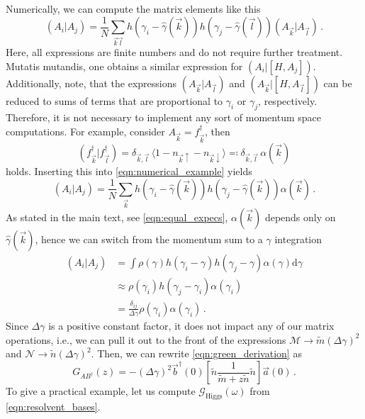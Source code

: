 \documentclass[
    reprint, 
    aps,
    preprintnumbers,
    twocolumn,
    prb,
    superscriptaddress
]{revtex4-2}
\newcommand{\vk}{\vec{k}}
\newcommand{\vl}{\vec{l}}
\newcommand{\dgamma}{\mathrm{d}\gamma}
\newcommand{\mM}{\mathcal{M}}
\newcommand{\mN}{\mathcal{N}}
\newcommand{\greens}[1]{\mathcal{G}_\text{#1} (\omega)}
\begin{document}
Numerically, we can compute the matrix elements like this
\begin{equation}
    \label{eqn:numerical_example}
    (A_i | A_j) = \frac{1}{N} \sum_{\vk \vl} h(\gamma_i - \hat{\gamma}(\vk)) h(\gamma_j - \hat{\gamma}(\vl)) (A_{\vk} | A_{\vl})\,.
\end{equation}
Here, all expressions are finite numbers and do not require further treatment.
Mutatis mutandis, one obtains a similar expression for $(A_i | [H, A_j])$.
Additionally, note, that the expressions $(A_{\vk} | A_{\vl})$ and $(A_{\vk} | [H, A_{\vl}])$ can be reduced to sums of terms that are proportional to $\gamma_i$ or $\gamma_j$, respectively.
Therefore, it is not necessary to implement any sort of momentum space computations.
For example, consider $A_{\vk} = f_{\vk}^\dagger$, then
\begin{equation}
    ( f_{\vk}^\dagger | f_{\vl}^\dagger ) = \delta_{\vk, \vl}\, \langle 1 - n_{\vk \uparrow} - n_{\vk \downarrow} \rangle \eqqcolon \delta_{\vk, \vl}\, \alpha(\vk)
\end{equation}
holds. Inserting this into \eqref{eqn:numerical_example} yields
\begin{equation}
    (A_i | A_j) = \frac{1}{N} \sum_{\vk} h(\gamma_i - \hat{\gamma}(\vk)) h(\gamma_j - \hat{\gamma}(\vk)) \alpha(\vk)\,.
\end{equation}
As stated in the main text, see \eqref{eqn:equal_expecs}, $\alpha(\vk)$ depends only on $\hat{\gamma}(\vk)$, hence we can switch from the momentum sum to a $\gamma$ integration
\begin{align}
    (A_i | A_j) &= \int \rho(\gamma) h(\gamma_i - \gamma) h(\gamma_j - \gamma) \alpha(\gamma) \dgamma \nonumber \\
        &\approx \rho(\gamma_i) h(\gamma_j - \gamma_i) \alpha(\gamma_i) \nonumber \\
        &= \frac{\delta_{ij}}{\Delta \gamma} \rho(\gamma_i) \alpha(\gamma_i)\,.
\end{align}
Since $\Delta \gamma$ is a positive constant factor, it does not impact any of our matrix operations, i.e., we can pull it out to the front of the expressions $\mM \to \tilde{m} (\Delta \gamma)^2$ and $\mN \to \tilde{n} (\Delta \gamma)^2$.
Then, we can rewrite \eqref{eqn:green_derivation} as
\begin{equation}
    G_{AB^\dagger}(z) = - (\Delta \gamma)^2 \vec{b}^\dagger (0) \left[ \tilde{n} \frac{1}{\tilde{m} + z \tilde{n}} \tilde{n} \right] \vec{a}(0)\,.
\end{equation}
To give a practical example, let us compute $\greens{Higgs}$ from \eqref{eqn:resolvent_bases}.
\end{document}
